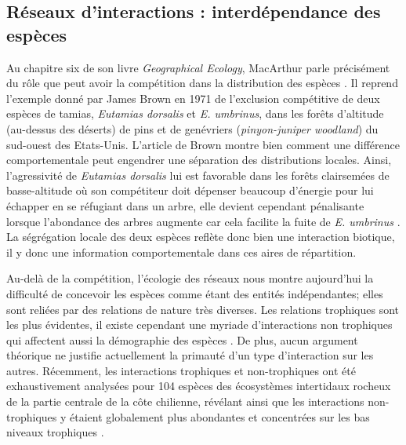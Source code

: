 \subsection*{Réseaux d'interactions : interdépendance des
espèces}\label{ruxe9seaux-dinteractions-interduxe9pendance-des-espuxe8ces}

Au chapitre six de son livre \emph{Geographical Ecology}, MacArthur
parle précisément du rôle que peut avoir la compétition dans la
distribution des espèces \citep{macarthur1972geographical}. Il reprend
l'exemple donné par James Brown en 1971 de l'exclusion compétitive de
deux espèces de tamias, \emph{Eutamias dorsalis} et \emph{E. umbrinus},
dans les forêts d'altitude (au-dessus des déserts) de pins et de
genévriers (\emph{pinyon-juniper woodland}) du sud-ouest des Etats-Unis.
L'article de Brown montre bien comment une différence comportementale
peut engendrer une séparation des distributions locales. Ainsi,
l'agressivité de \emph{Eutamias dorsalis} lui est favorable dans les
forêts clairsemées de basse-altitude où son compétiteur doit dépenser
beaucoup d'énergie pour lui échapper en se réfugiant dans un arbre, elle
devient cependant pénalisante lorsque l'abondance des arbres augmente
car cela facilite la fuite de \emph{E. umbrinus} \citep{Brown1971}. La
ségrégation locale des deux espèces reflète donc bien une interaction
biotique, il y donc une information comportementale dans ces aires de
répartition.

Au-delà de la compétition, l'écologie des réseaux nous montre
aujourd'hui la difficulté de concevoir les espèces comme étant des
entités indépendantes; elles sont reliées par des relations de nature
très diverses. Les relations trophiques sont les plus évidentes, il
existe cependant une myriade d'interactions non trophiques qui affectent
aussi la démographie des espèces \citep[voir][ pour une réflexion sur le
sujet et une classification de ces interactions]{Kefi2012}. De plus,
aucun argument théorique ne justifie actuellement la primauté d'un type
d'interaction sur les autres. Récemment, les interactions trophiques et
non-trophiques ont été exhaustivement analysées pour 104 espèces des
écosystèmes intertidaux rocheux de la partie centrale de la côte
chilienne, révélant ainsi que les interactions non-trophiques y étaient
globalement plus abondantes et concentrées sur les bas niveaux
trophiques \citep{Kefi2015}.

